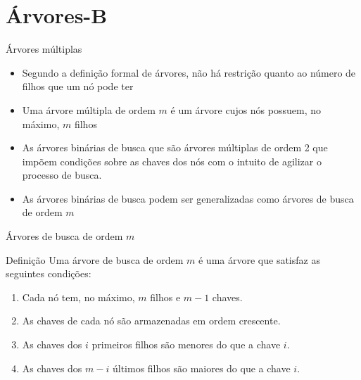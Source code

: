 \section{Árvores-B}

\begin{frame}[fragile]{Árvores múltiplas}

	\begin{itemize}
		\item Segundo a definição formal de árvores, não há restrição quanto ao número de filhos 
            que um nó pode ter 

		\item Uma árvore múltipla de ordem $m$ é um árvore cujos nós possuem, no máximo, $m$ filhos

		\item As árvores binárias de busca que são árvores múltiplas de ordem 2 que impõem 
        condições sobre as chaves dos nós com o intuito de agilizar o processo de busca.

		\item  As árvores binárias de busca podem ser generalizadas como árvores de busca de ordem 
            $m$ 

	\end{itemize}

\end{frame}

\begin{frame}[fragile]{Árvores de busca de ordem $m$}

	\begin{block}{Definição}
		Uma árvore de busca de ordem $m$ é uma árvore que satisfaz as seguintes condições:

		\begin{enumerate}
			\item Cada nó tem, no máximo, $m$ filhos e $m - 1$ chaves.
			\item As chaves de cada nó são armazenadas em ordem crescente.
			\item As chaves dos $i$ primeiros filhos são menores do que a chave $i$.
			\item As chaves dos $m - i$ últimos filhos são maiores do que a chave $i$.
		\end{enumerate}
	\end{block}

\end{frame}

